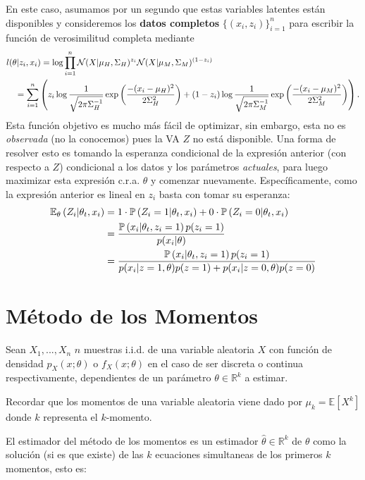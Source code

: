 En este caso, asumamos por un segundo que estas variables latentes están disponibles y consideremos los \textbf{datos completos} $\{(x_i,z_i)\}_{i=1}^n$ para escribir la función de verosimilitud completa mediante
\begin{align*}
	l(\theta|z_i,x_i) &= \log\prod_{i=1}^n \cN(X|\mu_H,\Sigma_H)^{z_i} \cN(X|\mu_M,\Sigma_M)^{(1-z_i)}\\
	&\hspace{-3em}= \sum_{i=1}^n \left( z_i\log\frac{1}{\sqrt{2\pi\Sigma_H^{-1}}}\expo{\frac{-(x_i-\mu_H)^2}{2\Sigma^2_H}} + (1-z_i)\log\frac{1}{\sqrt{2\pi\Sigma_M^{-1}}}\expo{\frac{-(x_i-\mu_M)^2}{2\Sigma^2_M}}\right).
\end{align*}
Esta función objetivo es mucho más fácil de optimizar, sin embargo, esta no es \emph{observada} (no la conocemos) pues la VA $Z$ no está disponible. Una forma de resolver esto es tomando la esperanza condicional de la expresión anterior (con respecto a $Z$) condicional a los datos y los parámetros \textit{actuales}, para luego maximizar esta expresión c.r.a. $\theta$ y comenzar nuevamente. Específicamente, como la expresión anterior es lineal en $z_i$ basta con tomar su esperanza: 
\begin{align*}
	\mathbb{E}_\theta \left(Z_i|\theta_t,x_i\right) &= 1\cdot\mathbb{P} \left(Z_i=1|\theta_t,x_i\right) + 0\cdot\mathbb{P} \left(Z_i=0|\theta_t,x_i\right)\\
	&= 	\frac{\mathbb{P} \left(x_i|\theta_t,z_i=1\right) p(z_i=1)}{p(x_i|\theta)}\\
	&= 	\frac{\mathbb{P} \left(x_i|\theta_t,z_i=1\right) p(z_i=1)}{p(x_i|z=1,\theta)p(z=1)+p(x_i|z=0	,\theta)p(z=0)}
\end{align*}

\section{Método de los Momentos}

Sean $X_1,...,X_n$ $n$ muestras i.i.d. de una variable aleatoria $X$ con función de densidad $p_X(x;\theta)$ o $f_X(x;\theta)$ en el caso de ser discreta o continua respectivamente, dependientes de un parámetro $\theta\in\mathbb{R}^k$ a estimar.

Recordar que los momentos de una variable aleatoria viene dado por $\mu_k=\mathbb{E}[X^k]$ donde $k$ representa el $k$-momento.

El estimador del método de los momentos es un estimador $\hat{\theta}\in\mathbb{R}^k$ de $\theta$ como la solución (si es que existe) de las $k$ ecuaciones simultaneas de los primeros $k$ momentos, esto es:

